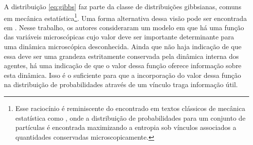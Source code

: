 A distribuição \eqref{eq:gibbs} faz parte da classe de distribuições gibbsianas, comuns em mecânica estatística\footnote{Esse raciocínio é reminiscente do encontrado em textos clássicos de mecânica estatística como \citet{Landau1980}, onde a distribuição de probabilidades para um conjunto de partículas é encontrada maximizando a entropia sob vínculos associados a quantidades conservadas microscopicamente.}\cite{Landau1980}. Uma forma alternativa dessa visão pode ser encontrada\cite{NCaticha2011} em \citet{NCaticha2011}. Nesse trabalho, os autores consideraram um modelo em que há uma função das variáveis microscópicas cujo valor deve ser importante determinante para uma dinâmica microscópica desconhecida. Ainda que não haja indicação de que essa deve ser uma grandeza estritamente conservada pela dinâmica interna dos agentes, há uma indicação de que o valor dessa função oferece informação sobre esta dinâmica. Isso é o suficiente para que a incorporação do valor dessa função na distribuição de probabilidades através de um vínculo traga informação útil. 

